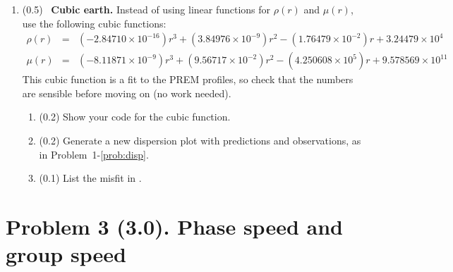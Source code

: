 \documentclass[11pt,titlepage,fleqn]{article}
\begin{document}
\begin{enumerate}
\item (0.5) \ptag\ {\bf Cubic earth.} Instead of using linear functions for $\rho(r)$ and $\mu(r)$, use the following cubic functions:
%
\begin{eqnarray*}
\rho(r) &=& (-2.84710 \times 10^{-16})r^3 + (3.84976 \times 10^{-9})r^2 - (1.76479 \times 10^{-2})r + 3.24479 \times 10^{4}
\\
\mu(r) &=& (-8.11871 \times 10^{-9}) r^3 + (9.56717 \times 10^{-2})r^2 - (4.250608 \times 10^{5})r + 9.578569 \times 10^{11}
\end{eqnarray*}
%
%
This cubic function is a fit to the PREM profiles, so check that the numbers are sensible before moving on (no work needed).

\begin{enumerate}
\item (0.2) Show your code for the cubic function.
\item (0.2) Generate a new dispersion plot with predictions and observations, as in Problem~1-\ref{prob:disp}.
\item (0.1) List the misfit in .
\end{enumerate}

\label{prob:earth_cubic}

%


\end{enumerate}


\pagebreak
\section*{Problem 3 (3.0). Phase speed and group speed}
\end{document}

